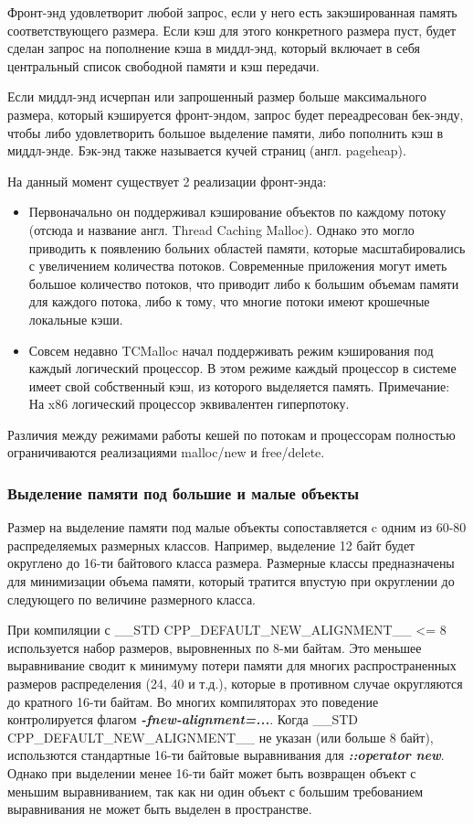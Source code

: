 Фронт-энд удовлетворит любой запрос, если у него есть закэшированная память соответствующего размера. Если кэш для этого конкретного размера пуст, будет сделан запрос на пополнение кэша в миддл-энд, который включает в себя центральный список свободной памяти и кэш передачи.

Если миддл-энд исчерпан или запрошенный размер больше максимального размера, который кэшируется фронт-эндом, запрос будет переадресован бек-энду, чтобы либо удовлетворить большое выделение памяти, либо пополнить кэш в миддл-энде. Бэк-энд также называется кучей страниц (англ. pageheap).

На данный момент существует 2 реализации фронт-энда:
\begin{itemize}
	\item Первоначально он поддерживал кэширование объектов по каждому потоку (отсюда и название англ. Thread Caching Malloc). Однако это могло приводить к появлению больних областей памяти, которые масштабировались с увеличением количества потоков. Современные приложения могут иметь большое количество потоков, что приводит либо к большим объемам памяти для каждого потока, либо к тому, что многие потоки имеют крошечные локальные кэши.
	\item Совсем недавно TCMalloc начал поддерживать режим кэширования под каждый логический процессор. В этом режиме каждый процессор в системе имеет свой собственный кэш, из которого выделяется память. Примечание: На x86 логический процессор эквивалентен гиперпотоку.
\end{itemize}

Различия между режимами работы кешей по потокам и процессорам полностью ограничиваются реализациями malloc/new и free/delete.

\subsubsection{Выделение памяти под большие и малые объекты}

Размер на выделение памяти под малые объекты сопоставляется c одним из 60-80 распределяемых размерных классов. Например, выделение 12 байт будет округлено до 16-ти байтового класса размера. Размерные классы предназначены для минимизации объема памяти, который тратится впустую при округлении до следующего по величине размерного класса.

При компиляции с  \_\_STD CPP\_DEFAULT\_NEW\_ALIGNMENT\_\_ <= 8 используется набор размеров, выровненных по 8-ми байтам. Это меньшее выравнивание сводит к минимуму потери памяти для многих распространенных размеров распределения (24, 40 и т.д.), которые в противном случае округляются до кратного 16-ти байтам. Во многих компиляторах это поведение контролируется флагом \textbf{\textit{-fnew-alignment=...}}. Когда \_\_STD CPP\_DEFAULT\_NEW\_ALIGNMENT\_\_ не указан (или больше 8 байт), использются стандартные 16-ти байтовые выравнивания для \textit{\textbf{::operator new}}. Однако при выделении менее 16-ти байт может быть возвращен объект с меньшим выравниванием, так как ни один объект с большим требованием выравнивания не может быть выделен в пространстве.


